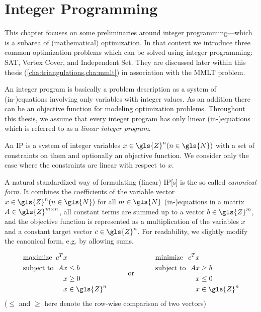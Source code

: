 \chapter{Integer Programming}
\label{cha:integer_programming}
This chapter focuses on some preliminaries around integer
programming---which is a subarea of (mathematical) optimization.
In that context we introduce three common optimization problems which
can be solved using integer programming: SAT, Vertex Cover, and
Independent Set. They are discussed later within this thesis
(\cref{cha:triangulations,cha:mmlt}) in association with the
\gls{MMLT} problem.

An integer program is basically a problem description as a system
of (in-)equations involving only variables with integer values. As
an addition there can be an objective function for modeling
optimization problems. Throughout this thesis, we assume that every
integer program has only linear (in-)equations which is referred to as
a \emph{linear integer program}.

\begin{definition}
  An \gls{IP} is a system of integer variables
  \(x \in \gls{Z}^n (n \in \gls{N})\)
  with a set of constraints on them
  and optionally an objective function. 
  We consider only the case
  where the constraints are linear with respect to \(x\).
\end{definition}

A natural standardized way of formulating (linear) \gls{IP}[s] is the 
so called \emph{canonical form.} It combines the coefficients of the
variable vector \(x \in \gls{Z}^n (n \in \gls{N})\)
for all \(m \in \gls{N}\) (in-)equations
in a matrix \(A \in \gls{Z}^{m \times n}\), 
all constant terms are
summed up to a vector \(b \in \gls{Z}^m\), and the objective function is represented
as a multiplication of the variables \(x\) and a constant target
vector \(c \in \gls{Z}^n\). For readability, we slightly modify the canonical form,
e.g. by allowing sums.

\begin{problem}
  \[
  \begin{array}{lll}
    \begin{alignedat}{2}
      &\text{maximize } & c^Tx \\
      &\text{subject to } & Ax &\leq b \\
      && x &\geq 0 \\
      && x &\in \gls{Z}^n
    \end{alignedat}
    & \text{\hspace{2em}or\hspace{2em}} &
    \begin{alignedat}{2}
      &\text{minimize } & c^Tx \\
      &\text{subject to } & Ax &\geq b \\
      && x &\leq 0 \\
      && x &\in \gls{Z}^n
    \end{alignedat}
  \end{array}
  \]
  (\(\leq\) and \(\geq\) here denote the row-wise comparison
  of two vectors)
\end{problem}

